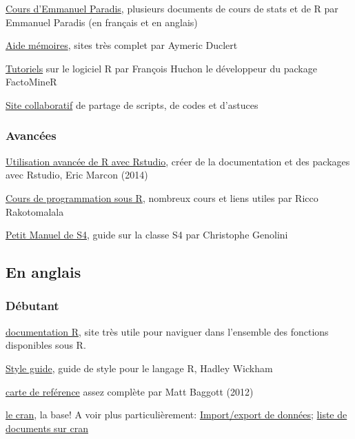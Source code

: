 \documentclass[11, a4paper, landscape]{article}
\begin{document}
\begin{multicols*}{3}
\href{http://ape-package.ird.fr/ep/teaching.html}{Cours d'Emmanuel Paradis}, plusieurs documents de cours de stats et de R par Emmanuel Paradis (en français et en anglais)

\href{http://www.duclert.org/} {Aide mémoires}, sites très complet par Aymeric Duclert

\href{http://math.agrocampus-ouest.fr/infoglueDeliverLive/membres/Francois.Husson/Rcorner}{Tutoriels} sur le logiciel R par François Huchon le développeur du package FactoMineR 

\href{http://abcdr.guyader.pro/}{Site collaboratif} de partage de scripts, de codes et d’astuces


\subsubsection{Avancées}

\href{http://www.ecofog.gf/IMG/pdf/r-rstudio.pdf}{Utilisation avancée de R avec Rstudio}, créer de la documentation et des packages avec Rstudio, Eric Marcon (2014)

\href{http://eric.univ-lyon2.fr/~ricco/cours/cours_programmation_R.html}{Cours de programmation sous R}, nombreux cours et liens utiles par Ricco Rakotomalala

\href{http://cran.r-project.org/doc/contrib/Genolini-PetitManuelDeS4.pdf}{Petit Manuel de S4}, guide sur la classe S4 par Christophe Genolini 



\subsection{En anglais}

\subsubsection{Débutant}

\href{http://www.rdocumentation.org/}{documentation R}, site très utile pour naviguer dans l'ensemble des fonctions disponibles sous R.

\href{http://r-pkgs.had.co.nz/style.html}{Style guide}, guide de style pour le langage R, Hadley Wickham
 
\href{http://cran.r-project.org/doc/contrib/Baggott-refcard-v2.pdf}{carte de reférence} assez complète par Matt Baggott (2012)

\href{http://cran.r-project.org}{le cran}, la base! A voir plus particulièrement: \href{http://cran.r-project.org/doc/manuals/R-data.html}{Import/export de données}; \href{http://cran.r-project.org/other-docs.html}{liste de documents sur cran}


\end{multicols*}
\end{document}

